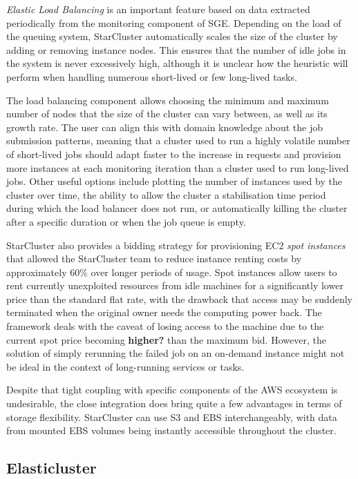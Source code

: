 \textit{Elastic Load Balancing} is an important feature based on data extracted periodically from the monitoring component of SGE. Depending on the load of the queuing system, StarCluster automatically scales the size of the cluster by adding or removing instance nodes. This ensures that the number of idle jobs in the system is never excessively high, although it is unclear how the heuristic will perform when handling numerous short-lived or few long-lived tasks. 

The load balancing component allows choosing the minimum and maximum number of nodes that the size of the cluster can vary between, as well as its growth rate. The user can align this with domain knowledge about the job submission patterns, meaning that a cluster used to run a highly volatile number of short-lived jobs should adapt faster to the increase in requests and provision more instances at each monitoring iteration than a cluster used to run long-lived jobs. Other useful options include plotting the number of instances used by the cluster over time, the ability to allow the cluster a stabilisation time period during which the load balancer does not run, or automatically killing the cluster after a specific duration or when the job queue is empty.

StarCluster also provides a bidding strategy for provisioning EC2 \textit{spot instances} that allowed the StarCluster team to reduce instance renting costs by approximately 60\% over longer periods of usage. Spot instances allow users to rent currently unexploited resources from idle machines for a significantly lower price than the standard flat rate, with the drawback that access may be suddenly terminated when the original owner needs the computing power back. The framework deals with the caveat of losing access to the machine due to the current spot price becoming \textbf{higher?} than the maximum bid. However, the solution of simply rerunning the failed job on an on-demand instance might not be ideal in the context of long-running services or tasks.

Despite that tight coupling with specific components of the AWS ecosystem is undesirable, the close integration does bring quite a few advantages in terms of storage flexibility. StarCluster can use S3 and EBS interchangeably, with data from mounted EBS volumes being instantly accessible throughout the cluster.

\subsection{Elasticluster}

